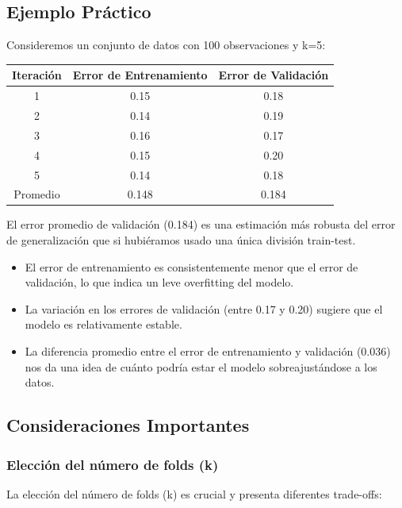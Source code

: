 \documentclass[12pt]{article}
\begin{document}
\subsection{Ejemplo Práctico}
Consideremos un conjunto de datos con 100 observaciones y k=5:

\begin{table}[H]
    \centering
    \begin{tabular}{ccc}
        \toprule
        Iteración & Error de Entrenamiento & Error de Validación \\
        \midrule
        1 & 0.15 & 0.18 \\
        2 & 0.14 & 0.19 \\
        3 & 0.16 & 0.17 \\
        4 & 0.15 & 0.20 \\
        5 & 0.14 & 0.18 \\
        \midrule
        Promedio & 0.148 & 0.184 \\
        \bottomrule
    \end{tabular}
\end{table}

El error promedio de validación (0.184) es una estimación más robusta del error de generalización que si hubiéramos usado una única división train-test.

\begin{itemize}
    \item El error de entrenamiento es consistentemente menor que el error de validación, lo que indica un leve overfitting del modelo.
    \item La variación en los errores de validación (entre 0.17 y 0.20) sugiere que el modelo es relativamente estable.
    \item La diferencia promedio entre el error de entrenamiento y validación (0.036) nos da una idea de cuánto podría estar el modelo sobreajustándose a los datos.
\end{itemize}

\subsection{Consideraciones Importantes}
\subsubsection{Elección del número de folds (k)}
La elección del número de folds (k) es crucial y presenta diferentes trade-offs:
\end{document}
